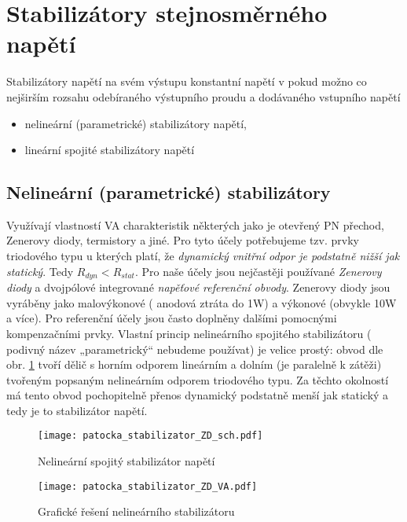   \section{Stabilizátory stejnosměrného napětí}
    Stabilizátory napětí na svém výstupu konstantní napětí v pokud možno co nejširším rozsahu odebíraného výstupního proudu a dodávaného vstupního napětí \cite{Zahlava}
    \begin{itemize}
      \item nelineární (parametrické) stabilizátory napětí,
      \item lineární spojité stabilizátory napětí
    \end{itemize}

    \subsection{Nelineární (parametrické) stabilizátory}
      Využívají vlastností VA charakteristik některých jako je otevřený PN přechod, Zenerovy diody, termistory a jiné. Pro tyto účely potřebujeme tzv. prvky triodového typu u kterých platí, že \emph{dynamický vnitřní odpor je podstatně nižší jak statický}. Tedy $R_{dyn} < R_{stat}$. Pro naše účely jsou nejčastěji používané \emph{Zenerovy diody} a dvojpólové integrované \emph{napěťové referenční obvody}. Zenerovy diody jsou vyráběny jako malovýkonové ( anodová ztráta do 1W) a výkonové (obvykle 10W a více). Pro referenční účely jsou často doplněny dalšími pomocnými kompenzačními prvky. Vlastní princip nelineární\-ho spojitého stabilizátoru ( podivný název „parametrický“ nebudeme použí\-vat) je velice prostý: obvod dle obr. \ref{enz:fig_sch_ZD_stab} tvoří dělič s horním odporem lineárním a dolním (je paralelně k zátěži) tvořeným popsaným nelineárním odporem triodového typu. Za těchto okolností má tento obvod pochopitelně přenos dynamický podstatně menší jak statický a tedy je to stabilizátor napětí.

      \begin{figure}[ht!]
         \centering
         \texttt{[image: patocka\_stabilizator\_ZD\_sch.pdf]}
         \caption{Nelineární spojitý stabilizátor napětí}
         \label{enz:fig_sch_ZD_stab}
       \end{figure}

      \begin{figure}[ht!]
         \centering
         \texttt{[image: patocka\_stabilizator\_ZD\_VA.pdf]}
         \caption{Grafické řešení nelineárního stabilizátoru}
         \label{enz:fig_graf_res_ZD_stab}
       \end{figure}

